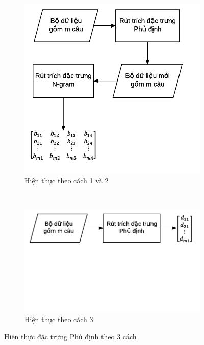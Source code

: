 \begin{figure}[h]
\begin{subfigure}[t]{0.5\textwidth}
\centering
\includegraphics[scale=0.7]{../hinh/hien_thuc_negation_1_2.png}
\caption{Hiện thực theo cách 1 và 2} \label{fig:hien-thuc-negation-1-2}
\end{subfigure}
~
\begin{subfigure}[t]{0.5\textwidth}
\centering
\includegraphics[scale=0.4]{../hinh/hien_thuc_negation_3.png}
\hfill
\caption{Hiện thực theo cách 3} \label{fig:hien-thuc-negation-3}
\end{subfigure}
\caption{Hiện thực đặc trưng Phủ định theo 3 cách}
\end{figure}

